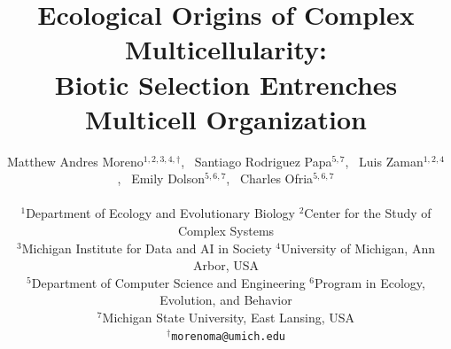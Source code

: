 
\title{
    Ecological Origins of Complex Multicellularity:\\Biotic Selection Entrenches Multicell Organization
}

\author{
    Matthew Andres Moreno$^{1,2,3,4,\dagger}$,\ %
    Santiago Rodriguez Papa$^{5,7}$,\ %
    Luis Zaman$^{1,2,4}$,\ %
    Emily Dolson$^{5,6,7}$,\ %
    Charles Ofria$^{5,6,7}$ \\
    \mbox{}\\
    $^1$Department of Ecology and Evolutionary Biology
    $^2$Center for the Study of Complex Systems \\
    $^3$Michigan Institute for Data and AI in Society
    $^4$University of Michigan, Ann Arbor, USA \\
    $^5$Department of Computer Science and Engineering
    $^6$Program in Ecology, Evolution, and Behavior \\
    $^7$Michigan State University, East Lansing, USA \\
    $^\dagger$\texttt{morenoma@umich.edu}
}

\maketitle

%
%

